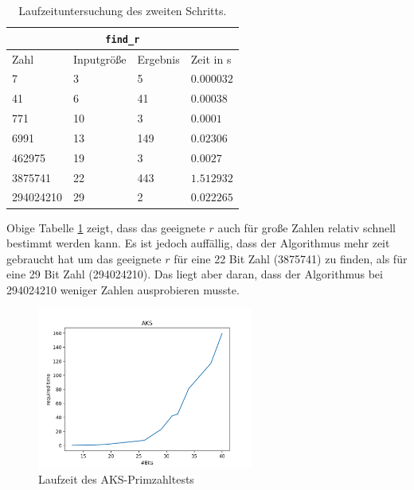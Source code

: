 \documentclass[12pt,oneside]{article}
\theoremstyle{remark}
\theoremstyle{definition}
\begin{document}
\begin{table}[h!]
\centering
\begin{tabular}{ |p{3cm}||p{3cm}|p{3cm}|p{3cm}|  }
 \hline
 \multicolumn{4}{|c|}{\texttt{find\_r}} \\
 \hline
 Zahl & Inputgröße &Ergebnis&Zeit in s\\
 \hline
 7   & 3    &5&   $0.000032$\\
 41&   6  & 41   &$0.00038$\\
 771 &10 & 3&  $0.0001$\\
 6991    &13 & 149&  $0.02306$\\
 462975&   19  & 3&$ 0.0027$\\
 3875741& 22  & 443   &$1.512932$\\
 294024210& 29  & 2&$0.022265$\\
 \hline
\end{tabular}
 \caption{Laufzeituntersuchung des zweiten Schritts.}
\label{table:2}
\end{table}

Obige Tabelle \ref{table:2} zeigt, dass das geeignete $r$ auch für große Zahlen relativ schnell bestimmt werden kann. Es ist jedoch auffällig, dass der Algorithmus mehr zeit gebraucht hat um das geeignete $r$ für eine 22 Bit Zahl (3875741) zu finden, als für eine 29 Bit Zahl (294024210). Das liegt aber daran, dass der Algorithmus bei 294024210 weniger Zahlen ausprobieren musste. 

\begin{figure}[h]
\includegraphics[width=7.06cm]{plots/aks.png}
\centering
\caption{Laufzeit des AKS-Primzahltests}
\label{aks-runtime}
\end{figure}
\end{document}

